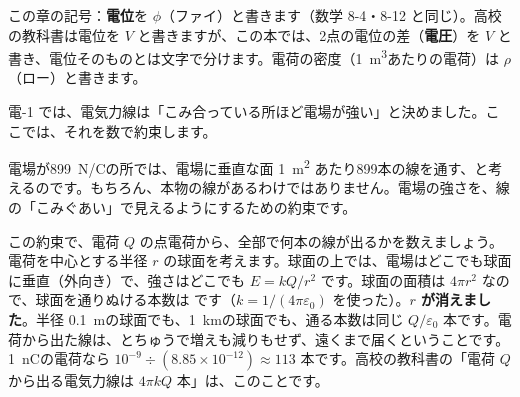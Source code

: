 \begin{omoidasou}
\end{omoidasou}

\noindent この章の記号：\textbf{電位}を $\phi$（ファイ）と書きます（数学 8-4・8-12 と同じ）。高校の教科書は電位を $V$ と書きますが、この本では、2点の電位の差（\textbf{電圧}）を $V$ と書き、電位そのものとは文字で分けます。電荷の密度（\qty{1}{m^3}あたりの電荷）は $\rho$（ロー）と書きます。



\label{ph:電-2:sec1}
電-1 では、電気力線は「こみ合っている所ほど電場が強い」と決めました。ここでは、それを数で約束します。
\begin{bkcenter}
\end{bkcenter}
電場が\qty{899}{N/C}の所では、電場に垂直な面 \qty{1}{m^2} あたり899本の線を通す、と考えるのです。もちろん、本物の線があるわけではありません。電場の強さを、線の「こみぐあい」で見えるようにするための約束です。

この約束で、電荷 $Q$ の点電荷から、全部で何本の線が出るかを数えましょう。電荷を中心とする半径 $r$ の球面を考えます。球面の上では、電場はどこでも球面に垂直（外向き）で、強さはどこでも $E=kQ/r^2$ です。球面の面積は $4\pi r^2$ なので、球面を通りぬける本数は
\label{ph:電-2:honsu}です（$k=1/(4\pi\varepsilon_0)$ を使った）。\textbf{$r$ が消えました}。半径 \qty{0.1}{m}の球面でも、\qty{1}{km}の球面でも、通る本数は同じ $Q/\varepsilon_0$ 本です。電荷から出た線は、とちゅうで増えも減りもせず、遠くまで届くということです。\qty{1}{nC}の電荷なら $10^{-9}\div(8.85\times10^{-12})\approx113$ 本です。高校の教科書の「電荷 $Q$ から出る電気力線は $4\pi kQ$ 本」は、このことです。


